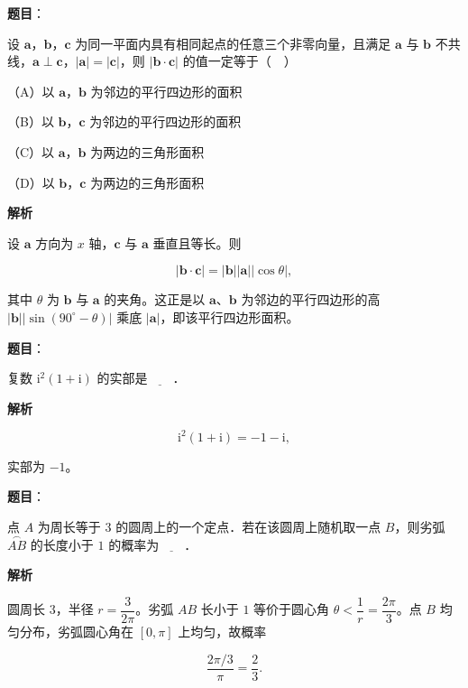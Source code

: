 \begin{answer}

\textbf{题目}：

设 $\boldsymbol a$，$\boldsymbol b$，$\boldsymbol c$ 为同一平面内具有相同起点的任意三个非零向量，且满足 $\boldsymbol a$ 与 $\boldsymbol b$ 不共线，$\boldsymbol a\perp\boldsymbol c$，$|\boldsymbol a|=|\boldsymbol c|$，则 $|\boldsymbol b\cdot\boldsymbol c|$ 的值一定等于（　）

（A）以 $\boldsymbol a$，$\boldsymbol b$ 为邻边的平行四边形的面积

（B）以 $\boldsymbol b$，$\boldsymbol c$ 为邻边的平行四边形的面积

（C）以 $\boldsymbol a$，$\boldsymbol b$ 为两边的三角形面积

（D）以 $\boldsymbol b$，$\boldsymbol c$ 为两边的三角形面积

\textbf{解析}

设 $\boldsymbol a$ 方向为 $x$ 轴，$\boldsymbol c$ 与 $\boldsymbol a$ 垂直且等长。则

\nopagebreak[4]
\[|\boldsymbol b\cdot\boldsymbol c|=|\boldsymbol b||\boldsymbol a||\cos\theta|,\]

其中 $\theta$ 为 $\boldsymbol b$ 与 $\boldsymbol a$ 的夹角。这正是以 $\boldsymbol a$、$\boldsymbol b$ 为邻边的平行四边形的高 $|\boldsymbol b||\sin(90^\circ-\theta)|$ 乘底 $|\boldsymbol a|$，即该平行四边形面积。


\end{answer}
\begin{answer}

\textbf{题目}：

复数 $\mathrm i^2(1+\mathrm i)$ 的实部是$\underline{\qquad}$．

\textbf{解析}

\nopagebreak[4]
\[\mathrm i^2(1+\mathrm i)=-1-\mathrm i,\]

实部为 $-1$。


\end{answer}
\begin{answer}

\textbf{题目}：

点 $A$ 为周长等于 $3$ 的圆周上的一个定点．若在该圆周上随机取一点 $B$，则劣弧 $\overset{\frown}{AB}$ 的长度小于 $1$ 的概率为$\underline{\qquad}$．

\textbf{解析}

圆周长 $3$，半径 $r=\dfrac3{2\pi}$。劣弧 $AB$ 长小于 $1$ 等价于圆心角 $\theta<\dfrac1r=\dfrac{2\pi}3$。点 $B$ 均匀分布，劣弧圆心角在 $[0,\pi]$ 上均匀，故概率

\nopagebreak[4]
\[\frac{2\pi/3}{\pi}=\frac23.\]


\end{answer}
